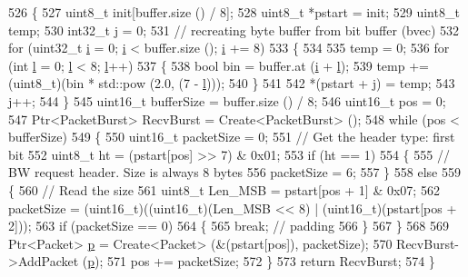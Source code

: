 \begin{DoxyCode}
526 \{
527   uint8\_t init[buffer.size () / 8];
528   uint8\_t *pstart = init;
529   uint8\_t temp;
530   int32\_t j = 0;
531   \textcolor{comment}{// recreating byte buffer from bit buffer (bvec)}
532   \textcolor{keywordflow}{for} (uint32\_t \hyperlink{bernuolliDistribution_8m_a6f6ccfcf58b31cb6412107d9d5281426}{i} = 0; \hyperlink{bernuolliDistribution_8m_a6f6ccfcf58b31cb6412107d9d5281426}{i} < buffer.size (); \hyperlink{bernuolliDistribution_8m_a6f6ccfcf58b31cb6412107d9d5281426}{i} += 8)
533     \{
534 
535       temp = 0;
536       \textcolor{keywordflow}{for} (\textcolor{keywordtype}{int} \hyperlink{buildings__pathloss_8m_a5b54c0a045f179bcbbbc9abcb8b5cd4c}{l} = 0; \hyperlink{buildings__pathloss_8m_a5b54c0a045f179bcbbbc9abcb8b5cd4c}{l} < 8; \hyperlink{buildings__pathloss_8m_a5b54c0a045f179bcbbbc9abcb8b5cd4c}{l}++)
537         \{
538           \textcolor{keywordtype}{bool} bin = buffer.at (\hyperlink{bernuolliDistribution_8m_a6f6ccfcf58b31cb6412107d9d5281426}{i} + \hyperlink{buildings__pathloss_8m_a5b54c0a045f179bcbbbc9abcb8b5cd4c}{l});
539           temp += (uint8\_t)(bin * std::pow (2.0, (7 - \hyperlink{buildings__pathloss_8m_a5b54c0a045f179bcbbbc9abcb8b5cd4c}{l})));
540         \}
541 
542       *(pstart + j) = temp;
543       j++;
544     \}
545   uint16\_t bufferSize = buffer.size () / 8;
546   uint16\_t pos = 0;
547   Ptr<PacketBurst> RecvBurst = Create<PacketBurst> ();
548   \textcolor{keywordflow}{while} (pos < bufferSize)
549     \{
550       uint16\_t packetSize = 0;
551       \textcolor{comment}{// Get the header type: first bit}
552       uint8\_t ht = (pstart[pos] >> 7) & 0x01;
553       \textcolor{keywordflow}{if} (ht == 1)
554         \{
555           \textcolor{comment}{// BW request header. Size is always 8 bytes}
556           packetSize = 6;
557         \}
558       \textcolor{keywordflow}{else}
559         \{
560           \textcolor{comment}{// Read the size}
561           uint8\_t Len\_MSB = pstart[pos + 1] & 0x07;
562           packetSize = (uint16\_t)((uint16\_t)(Len\_MSB << 8) | (uint16\_t)(pstart[pos + 2]));
563           \textcolor{keywordflow}{if} (packetSize == 0)
564             \{
565               \textcolor{keywordflow}{break}; \textcolor{comment}{// padding}
566             \}
567         \}
568 
569       Ptr<Packet> \hyperlink{lte__link__budget_8m_ac9de518908a968428863f829398a4e62}{p} = Create<Packet> (&(pstart[pos]), packetSize);
570       RecvBurst->AddPacket (\hyperlink{lte__link__budget_8m_ac9de518908a968428863f829398a4e62}{p});
571       pos += packetSize;
572     \}
573   \textcolor{keywordflow}{return} RecvBurst;
574 \}
\end{DoxyCode}

